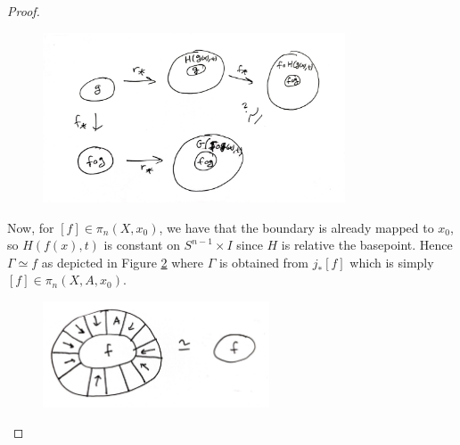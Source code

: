 \begin{proof}
        \begin{figure}[htpb]
            \centering
            \includegraphics[width=0.8\textwidth]{Figures/p33.jpeg}
            \caption{}
            \label{fig:p33-jpeg}
        \end{figure}
        





        Now, for 
        $\left[ f \right]  \in \pi_n \left( X, x_0 \right) $,
        we have that the boundary is
        already mapped to $x_0$, so
        $H \left( f(x), t \right)$ is constant
        on $S^{n-1} \times I$ since
        $H$ is relative the basepoint. Hence
        $\Gamma \simeq f$ as depicted in
        Figure \ref{fig:p322-jpeg} where
        $\Gamma$ is obtained from
        $j_* \left[ f \right] $ which is simply 
        $\left[ f \right] \in 
        \pi_n \left( X,A,x_0 \right) $.

        \begin{figure}[htpb]
            \centering
            \includegraphics[width=0.6\textwidth]{Figures/p322.jpeg}
            \caption{}
            \label{fig:p322-jpeg}
        \end{figure}
        

\end{proof}
